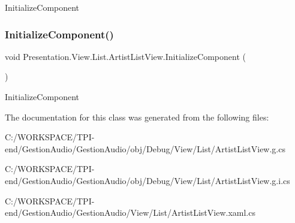 Initialize\+Component 

\mbox{\label{class_presentation_1_1_view_1_1_list_1_1_artist_list_view_a64ae6fa24884ea06d766083a1576dc4d}} 
\subsubsection{\texorpdfstring{Initialize\+Component()}{InitializeComponent()}\hspace{0.1cm}{\footnotesize\ttfamily [4/4]}}
{\footnotesize\ttfamily void Presentation.\+View.\+List.\+Artist\+List\+View.\+Initialize\+Component (\begin{DoxyParamCaption}{ }\end{DoxyParamCaption})}



Initialize\+Component 



The documentation for this class was generated from the following files\+:\begin{DoxyCompactItemize}
\item 
C\+:/\+W\+O\+R\+K\+S\+P\+A\+C\+E/\+T\+P\+I-\/end/\+Gestion\+Audio/\+Gestion\+Audio/obj/\+Debug/\+View/\+List/Artist\+List\+View.\+g.\+cs\item 
C\+:/\+W\+O\+R\+K\+S\+P\+A\+C\+E/\+T\+P\+I-\/end/\+Gestion\+Audio/\+Gestion\+Audio/obj/\+Debug/\+View/\+List/Artist\+List\+View.\+g.\+i.\+cs\item 
C\+:/\+W\+O\+R\+K\+S\+P\+A\+C\+E/\+T\+P\+I-\/end/\+Gestion\+Audio/\+Gestion\+Audio/\+View/\+List/Artist\+List\+View.\+xaml.\+cs\end{DoxyCompactItemize}
